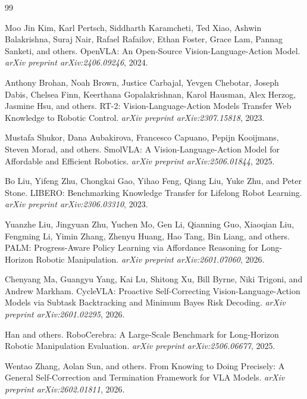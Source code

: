 \documentclass[10pt]{article}
\begin{document}
\begin{thebibliography}{99}


Moo Jin Kim, Karl Pertsch, Siddharth Karamcheti, Ted Xiao, Ashwin Balakrishna,
Suraj Nair, Rafael Rafailov, Ethan Foster, Grace Lam, Pannag Sanketi, and others.
\newblock OpenVLA: An Open-Source Vision-Language-Action Model.
\newblock \emph{arXiv preprint arXiv:2406.09246}, 2024.

Anthony Brohan, Noah Brown, Justice Carbajal, Yevgen Chebotar, Joseph Dabis,
Chelsea Finn, Keerthana Gopalakrishnan, Karol Hausman, Alex Herzog,
Jasmine Hsu, and others.
\newblock RT-2: Vision-Language-Action Models Transfer Web Knowledge
to Robotic Control.
\newblock \emph{arXiv preprint arXiv:2307.15818}, 2023.

Mustafa Shukor, Dana Aubakirova, Francesco Capuano, Pepijn Kooijmans,
Steven Morad, and others.
\newblock SmolVLA: A Vision-Language-Action Model for Affordable and
Efficient Robotics.
\newblock \emph{arXiv preprint arXiv:2506.01844}, 2025.


Bo Liu, Yifeng Zhu, Chongkai Gao, Yihao Feng, Qiang Liu,
Yuke Zhu, and Peter Stone.
\newblock LIBERO: Benchmarking Knowledge Transfer for Lifelong Robot Learning.
\newblock \emph{arXiv preprint arXiv:2306.03310}, 2023.


Yuanzhe Liu, Jingyuan Zhu, Yuchen Mo, Gen Li, Qianning Guo,
Xiaoqian Liu, Fengming Li, Yimin Zhang, Zhenyu Huang, Hao Tang,
Bin Liang, and others.
\newblock PALM: Progress-Aware Policy Learning via Affordance Reasoning
for Long-Horizon Robotic Manipulation.
\newblock \emph{arXiv preprint arXiv:2601.07060}, 2026.

Chenyang Ma, Guangyu Yang, Kai Lu, Shitong Xu, Bill Byrne,
Niki Trigoni, and Andrew Markham.
\newblock CycleVLA: Proactive Self-Correcting Vision-Language-Action Models
via Subtask Backtracking and Minimum Bayes Risk Decoding.
\newblock \emph{arXiv preprint arXiv:2601.02295}, 2026.

Han and others.
\newblock RoboCerebra: A Large-Scale Benchmark for Long-Horizon Robotic
Manipulation Evaluation.
\newblock \emph{arXiv preprint arXiv:2506.06677}, 2025.

Wentao Zhang, Aolan Sun, and others.
\newblock From Knowing to Doing Precisely: A General Self-Correction and
Termination Framework for VLA Models.
\newblock \emph{arXiv preprint arXiv:2602.01811}, 2026.


\end{thebibliography}
\end{document}
